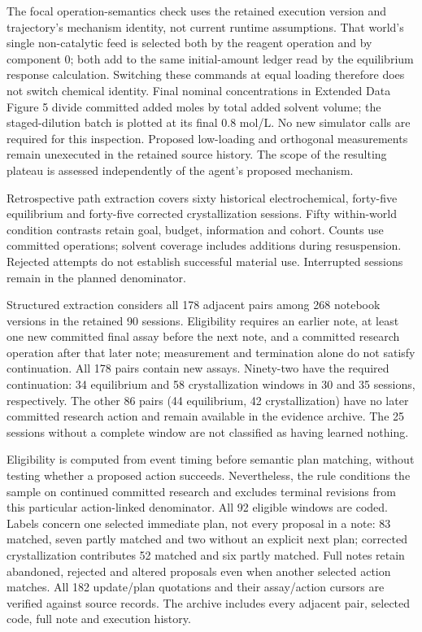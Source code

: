 \documentclass[10pt,a4paper]{article}
\begin{document}
The focal operation-semantics check uses the retained execution version and trajectory's mechanism identity, not current runtime assumptions. That world's single non-catalytic feed is selected both by the reagent operation and by component 0; both add to the same initial-amount ledger read by the equilibrium response calculation. Switching these commands at equal loading therefore does not switch chemical identity. Final nominal concentrations in Extended Data Figure 5 divide committed added moles by total added solvent volume; the staged-dilution batch is plotted at its final 0.8 mol/L. No new simulator calls are required for this inspection. Proposed low-loading and orthogonal measurements remain unexecuted in the retained source history. The scope of the resulting plateau is assessed independently of the agent's proposed mechanism.

Retrospective path extraction covers sixty historical electrochemical, forty-five equilibrium and forty-five corrected crystallization sessions. Fifty within-world condition contrasts retain goal, budget, information and cohort. Counts use committed operations; solvent coverage includes additions during resuspension. Rejected attempts do not establish successful material use. Interrupted sessions remain in the planned denominator.

Structured extraction considers all 178 adjacent pairs among 268 notebook versions in the retained 90 sessions. Eligibility requires an earlier note, at least one new committed final assay before the next note, and a committed research operation after that later note; measurement and termination alone do not satisfy continuation. All 178 pairs contain new assays. Ninety-two have the required continuation: 34 equilibrium and 58 crystallization windows in 30 and 35 sessions, respectively. The other 86 pairs (44 equilibrium, 42 crystallization) have no later committed research action and remain available in the evidence archive. The 25 sessions without a complete window are not classified as having learned nothing.

Eligibility is computed from event timing before semantic plan matching, without testing whether a proposed action succeeds. Nevertheless, the rule conditions the sample on continued committed research and excludes terminal revisions from this particular action-linked denominator. All 92 eligible windows are coded. Labels concern one selected immediate plan, not every proposal in a note: 83 matched, seven partly matched and two without an explicit next plan; corrected crystallization contributes 52 matched and six partly matched. Full notes retain abandoned, rejected and altered proposals even when another selected action matches. All 182 update/plan quotations and their assay/action cursors are verified against source records. The archive includes every adjacent pair, selected code, full note and execution history.
\end{document}
